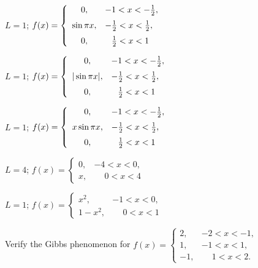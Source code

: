 \begin{exerciselist}
  \item\label{exer:11.2.12} $L=1$; \quad$f(x)= \left\{
  \begin{array}{cl}
    0,         & -1<x<-\frac{1}{2},           \\[2\jot]
    \sin\pi x, & -\frac{1}{2}<x<\frac{1}{2},  \\[2\jot]
    0,         & \phantom{-}{\frac{1}{2}}<x<1
  \end{array}\right.$

  \item\label{exer:11.2.13} $L=1$; \quad$f(x)= \left\{
  \begin{array}{cl}
    0,           & -1<x<-\frac{1}{2},           \\[2\jot]
    |\sin\pi x|, & -\frac{1}{2}<x<\frac{1}{2},  \\[2\jot]
    0,           & \phantom{-}{\frac{1}{2}}<x<1
  \end{array}\right.$

  \item\label{exer:11.2.14} $L=1$; \quad$f(x)= \left\{
  \begin{array}{cl}
    0,          & -1<x<-\frac{1}{2},           \\[2\jot]
    x\sin\pi x, & -\frac{1}{2}<x<\frac{1}{2},  \\[2\jot]
    0,          & \phantom{-}{\frac{1}{2}}<x<1
  \end{array}\right.$

  \item\label{exer:11.2.15} \Cex $L=4$; \quad $f(x)= \left\{
  \begin{array}{cl}
    0, & -4<x<0,          \\
    x, & \phantom{-}0<x<4
  \end{array}\right.$

  \item\label{exer:11.2.16} \Cex $L=1$; \quad $f(x)= \left\{
  \begin{array}{cl}
    x^{2},   & -1<x<0,          \\
    1-x^{2}, & \phantom{-}0<x<1
  \end{array}\right.$

  \item\label{exer:11.2.17} \Lex Verify the Gibbs phenomenon for \quad $f(x)= \left\{
  \begin{array}{rl}
    2,  & -2<x< -1,         \\
    1,  & -1<x<1,           \\
    -1, & \phantom{-}1<x<2.
  \end{array}\right.$


\end{exerciselist}
